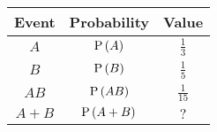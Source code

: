 \begin{tabular}{|c|c|c|} 
\hline
\textbf{Event} & \textbf{Probability} & \textbf{Value} \\
\hline
$A$ & $\text{P}\left(A\right)$ & $\frac{1}{3}$ \\
\hline
$B$ & $\text{P}\left(B\right)$ & $\frac{1}{5}$ \\
\hline
$AB$ & $\text{P}\left(AB\right)$ & $\frac{1}{15}$ \\
\hline
$A + B$ & $\text{P}\left(A + B\right)$ & $?$ \\
\hline
\end{tabular}